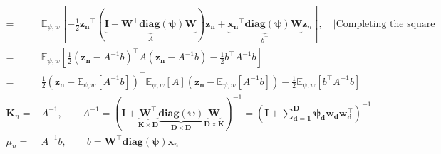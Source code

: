 \documentclass{article}
\begin{document}
\begin{align}
	=& \mathbb{E}_{\psi, w}\left[- \frac{1}{2} \mathbf{z_n}^\top(\underbrace{\mathbf{I + \mathbf{W}^\top\mathbf{\text{diag}(\psi)}\mathbf{W}}}_{A})\mathbf{z_n} +\underbrace{\mathbf{x_n}^\top \mathbf{\text{diag}(\psi)}\mathbf{W}}_ {b^\top}\mathbf{z}_{n}\right] , \quad | \text{Completing the square} \\
	=& \mathbb{E}_{\psi, w}\left[\frac{1}{2}(\mathbf{z_n} - A^{-1}b)^\top A (\mathbf{z_n} - A^{-1}b) - \frac{1}{2}b^\top A^{-1}b\right]  \\
	=& \frac{1}{2}(\mathbf{z_n} - \mathbb{E}_{\psi, w}[A^{-1}b])^\top \mathbb{E}_{\psi, w}[A] (\mathbf{z_n} - \mathbb{E}_{\psi, w}[A^{-1}b]) - \frac{1}{2}\mathbb{E}_{\psi, w}[b^\top A^{-1}b]\\
	\mathbf{K}_n =& A^{-1}, \qquad A^{-1} = \left( \mathbf{I + \underbrace{\mathbf{W}^\top}_{K \times D}\underbrace{\mathbf{\text{diag}(\psi)}}_{D\times D}\underbrace{\mathbf{W}}_{D\times K}}\right) ^{-1} =\left( \mathbf{I +\sum_{d=1}^{D}\psi_{d}\mathbf{w}_d\mathbf{w}_d^\top}\right)^{-1} \\
	\mu_n =& A^{-1}b, \qquad b = \mathbf{W}^\top\mathbf{\text{diag}(\psi)}\mathbf{x}_n
\end{align}
\end{document}
